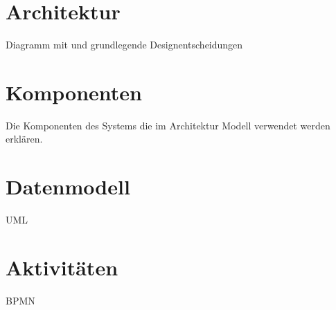 \section{Architektur}

Diagramm mit und grundlegende Designentscheidungen

\section{Komponenten}

Die Komponenten des Systems die im Architektur Modell verwendet werden erklären.

\section{Datenmodell}

UML

\section{Aktivitäten}

BPMN
